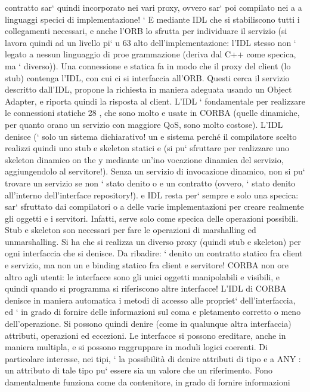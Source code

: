 \documentclass[a4paper,12pt]{article}
\begin{document}
contratto sar` quindi incorporato nei vari proxy, ovvero sar` poi compilato nei
a
a
linguaggi specici di implementazione!
`
E mediante IDL che si stabiliscono tutti i collegamenti necessari, e anche
l'ORB lo sfrutta per individuare il servizio (si lavora quindi ad un livello pi`
u
63
alto dell'implementazione: l'IDL stesso non ` legato a nessun linguaggio di proe
grammazione (deriva dal C++ come specica, ma ` diverso)). Una connessione
e
statica fa in modo che il proxy del client (lo stub) contenga l'IDL, con cui ci
si interfaccia all'ORB. Questi cerca il servizio descritto dall'IDL, propone la
richiesta in maniera adeguata usando un Object Adapter, e riporta quindi la
risposta al client.
L'IDL ` fondamentale per realizzare le connessioni statiche 28 , che sono molto
e
usate in CORBA (quelle dinamiche, per quanto orano un servizio con maggiore
QoS, sono molto costose). L'IDL denisce (` solo un sistema dichiarativo! un
e
sistema perché il compilatore scelto realizzi quindi uno stub e skeleton statici
e
(si pu` sfruttare per realizzare uno skeleton dinamico on the y mediante un'ino
vocazione dinamica del servizio, aggiungendolo al servitore!). Senza un servizio
di invocazione dinamico, non si pu` trovare un servizio se non ` stato denito
o
e
un contratto (ovvero, ` stato denito all'interno dell'interface repository!).
e
IDL resta per` sempre e solo una specica: sar` sfruttato dai compilatori
o
a
delle varie implementazioni per creare realmente gli oggetti e i servitori. Infatti,
serve solo come specica delle operazioni possibili.
Stub e skeleton son necessari per fare le operazioni di marshalling ed unmarshalling. Si ha che si realizza un diverso
proxy (quindi stub e skeleton) per ogni
interfaccia che si denisce.
Da ribadire: ` denito un contratto statico fra client e servizio, ma non un
e
binding statico fra client e servitore!
CORBA non ore altro agli utenti: le interfacce sono gli unici oggetti manipolabili e visibili, e quindi quando si
programma si riferiscono altre interfacce!
L'IDL di CORBA denisce in maniera automatica i metodi di accesso alle
propriet` dell'interfaccia, ed ` in grado di fornire delle informazioni sul coma
e
pletamento corretto o meno dell'operazione. Si possono quindi denire (come
in qualunque altra interfaccia) attributi, operazioni ed eccezioni. Le interfacce
si possono ereditare, anche in maniera multipla, e si possono raggruppare in
moduli logici coerenti.
Di particolare interesse, nei tipi, ` la possibilità di denire attributi di tipo
e
a
ANY : un attributo di tale tipo pu` essere sia un valore che un riferimento. Fono
damentalmente funziona come da contenitore, in grado di fornire informazioni
\end{document}
